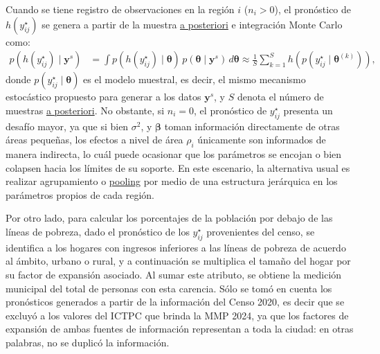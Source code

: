 \documentclass[11pt]{article}
\begin{document}
Cuando se tiene registro de observaciones en la región $i$ ($n_{i}>0$), el pronóstico de $h(y_{ij}^{\star})$ se genera a partir de la muestra \underline{a posteriori} e integración Monte Carlo como:
\begin{align}
p(h(y_{ij}^{\star}) \mid \boldsymbol{y}^{s}) &= \int p(h(y_{ij}^{\star}) \mid \boldsymbol{\theta}) \, p(\boldsymbol{\theta} \mid \boldsymbol{y}^{s}) \, d\boldsymbol{\theta} \approx \frac{1}{S} \sum_{k=1}^{S} h(p(y_{ij}^{\star} \mid \boldsymbol{\theta}^{(k)})),
\end{align}
donde $p(y_{ij}^{\star} \mid \boldsymbol{\theta})$ es el modelo muestral, es decir, el mismo mecanismo estocástico propuesto para generar a los datos $\boldsymbol{y}^{s}$, y $S$ denota el número de muestras \underline{a posteriori}. No obstante, si $n_{i}=0$, el pronóstico de $y_{ij}^{\star}$ presenta un desafío mayor, ya que si bien $\sigma^{2}$, y $\boldsymbol{\beta}$ toman información directamente de otras áreas pequeñas, los efectos a nivel de área $\rho_{i}$ únicamente son informados de manera indirecta, lo cuál puede ocasionar que los parámetros se encojan o bien colapsen hacia los límites de su soporte. En este escenario, la alternativa usual es realizar agrupamiento o \underline{pooling} por medio de una estructura jerárquica en los parámetros propios de cada región.

Por otro lado, para calcular los porcentajes de la población por debajo de las líneas de pobreza, dado el pronóstico de los $y_{ij}^{\star}$ provenientes del censo, se identifica a los hogares con ingresos inferiores a las líneas de pobreza de acuerdo al ámbito, urbano o rural, y a continuación se multiplica el tamaño del hogar por su factor de expansión asociado. Al sumar este atributo, se obtiene la medición municipal del total de personas con esta carencia.
Sólo se tomó en cuenta los pronósticos generados a partir de la información del Censo 2020, es decir que se excluyó a los valores del ICTPC que brinda la MMP 2024, ya que los factores de expansión de ambas fuentes de información representan a toda la ciudad: en otras palabras, no se duplicó la información.
\end{document}
